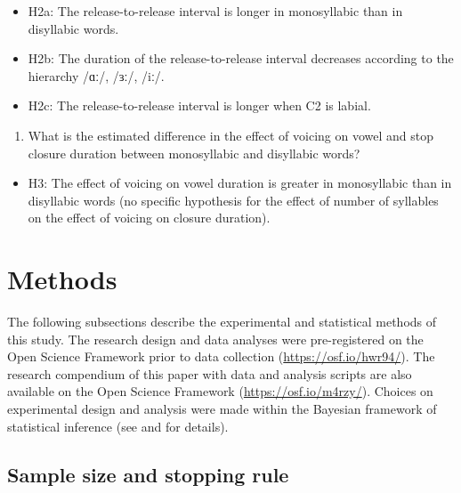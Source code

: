 \documentclass[12pt,a4paper,]{article}
\providecommand{\tightlist}{%
  \setlength{\itemsep}{0pt}\setlength{\parskip}{0pt}}
\begin{document}
\begin{itemize}
\tightlist
\item
  H2a: The release-to-release interval is longer in monosyllabic than in
  disyllabic words.
\item
  H2b: The duration of the release-to-release interval decreases
  according to the hierarchy /ɑː/, /ɜː/, /iː/.
\item
  H2c: The release-to-release interval is longer when C2 is labial.
\end{itemize}

\begin{enumerate}
\def\labelenumi{\arabic{enumi}.}
\setcounter{enumi}{2}
\tightlist
\item
  What is the estimated difference in the effect of voicing on vowel and
  stop closure duration between monosyllabic and disyllabic words?
\end{enumerate}

\begin{itemize}
\tightlist
\item
  H3: The effect of voicing on vowel duration is greater in monosyllabic
  than in disyllabic words (no specific hypothesis for the effect of
  number of syllables on the effect of voicing on closure duration).
\end{itemize}

\hypertarget{methods}{%
\section{Methods}\label{methods}}

The following subsections describe the experimental and statistical
methods of this study. The research design and data analyses were
pre-registered on the Open Science Framework prior to data collection
(\url{https://osf.io/hwr94/}). The research compendium of this paper
with data \citep{coretta2019g} and analysis scripts are also available
on the Open Science Framework (\url{https://osf.io/m4rzy/}). Choices on
experimental design and analysis were made within the Bayesian framework
of statistical inference (see  and 
for details).

\hypertarget{sample-size-and-stopping-rule}{%
\subsection{Sample size and stopping
rule}\label{sample-size-and-stopping-rule}}
\end{document}
